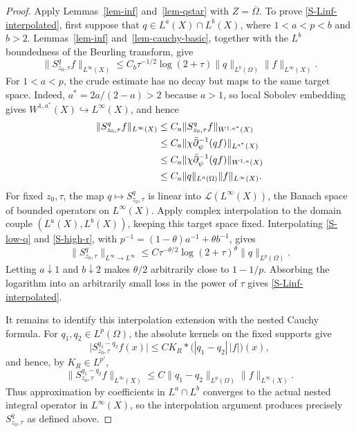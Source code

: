 \documentclass[a4paper,11pt]{article}
\theoremstyle{plain}
\theoremstyle{definition}
\theoremstyle{remark}
\begin{document}
\begin{proof}
Apply Lemmas~\ref{lem-inf} and~\ref{lem-qstar} with $Z=\overline\Omega$.  To prove \eqref{S-Linf-interpolated}, first suppose that $q\in L^a(X)\cap L^b(X)$, where $1<a<p<b$ and $b>2$.  Lemmas~\ref{lem-inf} and~\ref{lem-cauchy-basic}, together with the $L^b$ boundedness of the Beurling transform, give
\begin{equation}\label{S-high-r}
        \|S^q_{z_0,\tau}f\|_{L^\infty(X)}
        \leq C_b \tau^{-1/2}\log(2+\tau)
        \|q\|_{L^b(\Omega)}\|f\|_{L^\infty(X)} .
\end{equation}
For $1<a<p$, the crude estimate has no decay but maps to the same target space.  Indeed, $a^*=2a/(2-a)>2$ because $a>1$, so local Sobolev embedding gives $W^{1,a^*}(X)\hookrightarrow L^\infty(X)$, and hence
\begin{align}
        \|S^q_{z_0,\tau}f\|_{L^\infty(X)}
        &\leq C_a\|S^q_{z_0,\tau}f\|_{W^{1,a^*}(X)}                                    \notag\\
        &\leq C_a
        \|\chi\bar\partial_\psi^{-1}(qf)\|_{L^{a^*}(X)}                                  \notag\\
        &\leq C_a
        \|\chi\bar\partial_\psi^{-1}(qf)\|_{W^{1,a}(X)}                                  \notag\\
        &\leq C_a
        \|q\|_{L^a(\Omega)}\|f\|_{L^\infty(X)} .                         \label{S-low-q}
\end{align}
For fixed $z_0,\tau$, the map $q\mapsto S^q_{z_0,\tau}$ is linear into
$\mathcal L(L^\infty(X))$, the Banach space of bounded operators on
$L^\infty(X)$.  Apply complex interpolation to the domain couple
$(L^a(X),L^b(X))$, keeping this target space fixed.  Interpolating
\eqref{S-low-q} and \eqref{S-high-r}, with
\(p^{-1}=(1-\theta)a^{-1}+\theta b^{-1}\), gives
\begin{equation}
        \|S^q_{z_0,\tau}\|_{L^\infty\to L^\infty}
        \leq C \tau^{-\theta/2}\log(2+\tau)^\theta
        \|q\|_{L^p(\Omega)} .
\end{equation}
Letting $a\downarrow1$ and $b\downarrow2$ makes $\theta/2$ arbitrarily close to $1-1/p$.  Absorbing the logarithm into an arbitrarily small loss in the power of $\tau$ gives \eqref{S-Linf-interpolated}.

It remains to identify this interpolation extension with the nested Cauchy formula.  For $q_1,q_2\in L^p(\Omega)$, the absolute kernels on the fixed supports give
\begin{equation}\label{S-coefficient-continuity}
 \bigl|S^{q_1-q_2}_{z_0,\tau}f(x)\bigr|
 \leq C K_R*\bigl(|q_1-q_2|\,|f|\bigr)(x),
\end{equation}
and hence, by $K_R\in L^{p'}$,
\begin{equation}
 \|S^{q_1-q_2}_{z_0,\tau}f\|_{L^\infty(X)}
 \leq C\|q_1-q_2\|_{L^p(\Omega)}\|f\|_{L^\infty(X)}.
\end{equation}
Thus approximation by coefficients in $L^a\cap L^b$ converges to the actual nested integral operator in $L^\infty(X)$, so the interpolation argument produces precisely $S^q_{z_0,\tau}$ as defined above.


\end{proof}
\end{document}
